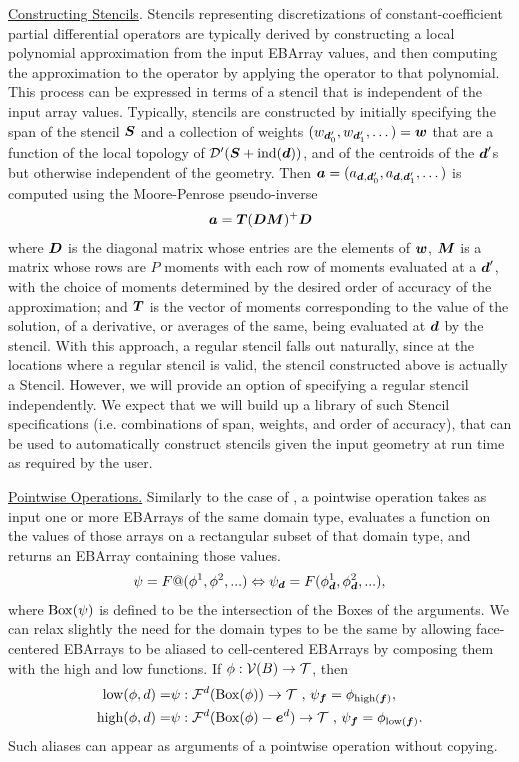 \documentclass[12pt]{article}
\newcommand{\ind}{{\rm{ind}}}
\newcommand{\low}{{\rm{low}}}
\newcommand{\high}{{\rm{high}}}
\newcommand{\face}{{\mbf{f}}}
\newcommand{\dgen}{{\mbf{d}}}
\begin{document}
\noindent 
\underline{Constructing Stencils}.
Stencils representing discretizations of constant-coefficient partial differential operators are typically derived by constructing a local polynomial approximation from the input EBArray values, and then computing the approximation to the operator by applying the operator to that polynomial. This process can be expressed in terms of a stencil that is independent of the input array values. Typically, stencils are constructed by initially specifying the span of the stencil ${\boldsymbol{S}}$ and a collection of weights $(w_{\dgen_0'},w_{\dgen_1'}, \dots ) = \mbf{w}$ that are a function of the local topology of $\mcl{D}'(\mbf{S} + \ind(\dgen))$, and of the centroids of the $\dgen'$s  but otherwise independent of the geometry. Then $\mbf{a} = (a_{\dgen,\dgen_0'}, a_{\dgen,\dgen_1'}, \dots )$ is computed using the Moore-Penrose pseudo-inverse
\begin{gather*}
{\boldsymbol{a}} = {\boldsymbol{T}} ({\boldsymbol{D}} {\boldsymbol{M}})^+ {\boldsymbol{D}}
\end{gather*}
where ${\boldsymbol{D}}$ is the diagonal matrix whose entries are the elements of ${\boldsymbol{w}}$, ${\boldsymbol{M}}$ is a matrix whose rows are $P$ moments with each row of moments evaluated at a $\dgen'$, with the choice of moments determined by the desired order of accuracy of the approximation; and ${\boldsymbol{T}}$ is the vector of moments corresponding to the value of the solution, of a derivative, or averages of the same, being evaluated at $\dgen$ by the stencil. With this approach, a regular stencil falls out naturally, since at the locations where a regular stencil is valid, the stencil constructed above is actually a \libname Stencil. However, we will provide an option of specifying a regular stencil independently. We expect that we will build up a library of such Stencil specifications (i.e. combinations of span, weights, and order of accuracy), that can be used to automatically construct stencils given the input geometry at run time as required by the user.

\noindent
\underline{Pointwise Operations.} Similarly to the case of , a pointwise operation takes as input one or more EBArrays of the same domain type, evaluates a function on the values of those arrays on a rectangular subset of that domain type, and returns an EBArray containing those values. 
\begin{gather*}
\psi = F@(\phi^{1},\phi^2, ...) \Leftrightarrow \psi_{\dgen} = F(\phi_\dgen^1,\phi_\dgen^2, ...),
\end{gather*}
where ${\rm Box}(\psi)$ is defined to be the intersection of the Boxes of the arguments.
We can relax slightly the need for the domain types to be the same by allowing face-centered EBArrays to be aliased to cell-centered EBArrays by composing them with the high and low functions. If $\phi:{\mathcal{V}}(B) \rightarrow {\mathcal{T}}$, then
\begin{align*}
\low(\phi,d) = & \psi:\mcl{F}^d(\MBox(\phi)) \rightarrow \mcl{T} \cma \psi_\face = \phi_{\high(\face)}, \\ 
\high(\phi,d) = & \psi:\mcl{F}^d(\MBox(\phi)- \mbf{e}^d) \rightarrow \mcl{T} \cma \psi_\face = \phi_{\low(\face)}.
\end{align*}
Such aliases can appear as arguments of a pointwise operation without copying.
\end{document}
